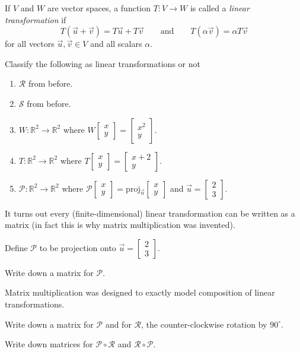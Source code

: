 \documentclass[14pt]{problemset}
\newcommand{\R}{\mathbb{R}}
\newcommand{\proj}{\mathrm{proj}}
\newcommand{\mat}[1]{\begin{bmatrix}#1\end{bmatrix}}
\begin{document}
	\begin{definition}
		If $V$ and $W$ are vector spaces, a function $T:V\to W$ is called a \emph{linear transformation}
		if 
		\[
			T(\vec u+\vec v)=T\vec u+T\vec v \qquad\text{and}\qquad
			T(\alpha \vec v)=\alpha T\vec v
		\]
		for all vectors $\vec u,\vec v\in V$ and all scalars $\alpha$.
	\end{definition}

	\question
	\begin{parts}
		\item Classify the following as linear transformations or not
			\begin{enumerate}
				\item $\mathcal R$ from before.
				\item $\mathcal S$ from before.
				\item $W:\R^2\to\R^2$ where $W\mat{x\\y}=\mat{x^2\\y}$.
				\item $T:\R^2\to\R^2$ where $T\mat{x\\y}=\mat{x+2\\y}$.
				\item $\mathcal P:\R^2\to\R^2$ where $\mathcal P\mat{x\\y}=\proj_{\vec u}\mat{x\\y}$ and 
					$\vec u=\mat{2\\3}$.
			\end{enumerate}
	\end{parts}

	It turns out every (finite-dimensional) linear transformation can be written as a matrix (in fact
	this is why matrix multiplication was invented).

	\question
	Define $\mathcal P$ to be projection onto $\vec u=\mat{2\\3}$.
	\begin{parts}
		\item Write down a matrix for $\mathcal P$.
	\end{parts}

	Matrix multiplication was designed to exactly model composition of linear transformations.
	\begin{parts}[resume]
		\item Write down a matrix for $\mathcal P$ and for $\mathcal R$, the counter-clockwise rotation
			by $90^\circ$.
		\item Write down matrices for $\mathcal P\circ\mathcal R$ and $\mathcal R\circ \mathcal P$.
	\end{parts}
\end{document}
